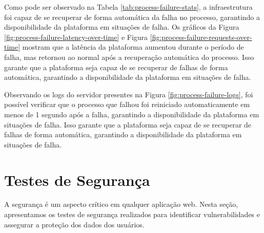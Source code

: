 

Como pode ser observado na Tabela \ref{tab:process-failure-stats}, a infraestrutura foi capaz de se recuperar de forma automática da falha no processo, garantindo a disponibilidade da plataforma em situações de falha. Os gráficos da Figura \ref{fig:process-failure-latency-over-time} e Figura \ref{fig:process-failure-requests-over-time} mostram que a latência da plataforma aumentou durante o período de falha, mas retornou ao normal após a recuperação automática do processo. Isso garante que a plataforma seja capaz de se recuperar de falhas de forma automática, garantindo a disponibilidade da plataforma em situações de falha.

Observando os logs do servidor presentes na Figura \ref{fig:process-failure-logs}, foi possível verificar que o processo que falhou foi reiniciado automaticamente em menos de 1 segundo após a falha, garantindo a disponibilidade da plataforma em situações de falha. Isso garante que a plataforma seja capaz de se recuperar de falhas de forma automática, garantindo a disponibilidade da plataforma em situações de falha.


\section{Testes de Segurança}

A segurança é um aspecto crítico em qualquer aplicação web. Nesta seção, apresentamos os testes de segurança realizados para identificar vulnerabilidades e assegurar a proteção dos dados dos usuários.

